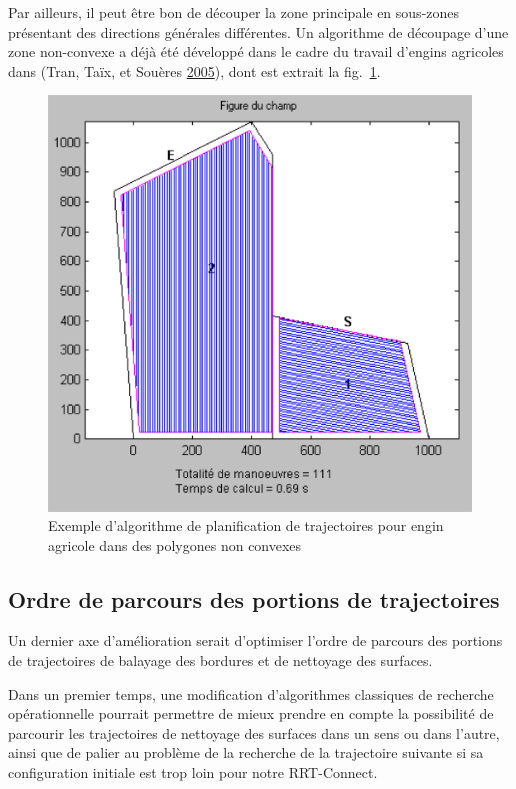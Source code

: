 \documentclass[french,A4paper,]{book}
\begin{document}
Par ailleurs, il peut être bon de découper la zone principale en
sous-zones présentant des directions générales différentes. Un
algorithme de découpage d'une zone non-convexe a déjà été développé dans
le cadre du travail d'engins agricoles dans (Tran, Taïx, et Souères
\protect\hyperlink{ref-decoupage}{2005}), dont est extrait la
fig.~\ref{fig:decoupage}.

\begin{figure}
\centering
\includegraphics[width=1.00000\textwidth]{imgs/decoupage.png}
\caption{Exemple d'algorithme de planification de trajectoires pour
engin agricole dans des polygones non convexes}\label{fig:decoupage}
\end{figure}

\subsection{Ordre de parcours des portions de
trajectoires}\label{ordre-de-parcours-des-portions-de-trajectoires}

Un dernier axe d'amélioration serait d'optimiser l'ordre de parcours des
portions de trajectoires de balayage des bordures et de nettoyage des
surfaces.

Dans un premier temps, une modification d'algorithmes classiques de
recherche opérationnelle pourrait permettre de mieux prendre en compte
la possibilité de parcourir les trajectoires de nettoyage des surfaces
dans un sens ou dans l'autre, ainsi que de palier au problème de la
recherche de la trajectoire suivante si sa configuration initiale est
trop loin pour notre RRT-Connect.
\end{document}
